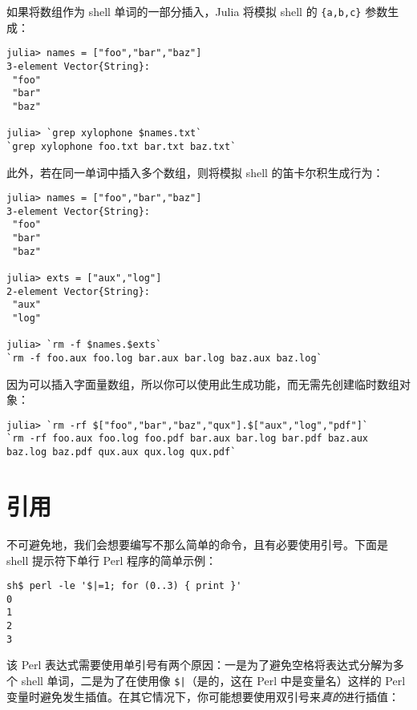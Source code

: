 如果将数组作为 shell 单词的一部分插入，Julia 将模拟 shell 的 \texttt{\{a,b,c\}} 参数生成：




\begin{verbatim}
julia> names = ["foo","bar","baz"]
3-element Vector{String}:
 "foo"
 "bar"
 "baz"

julia> `grep xylophone $names.txt`
`grep xylophone foo.txt bar.txt baz.txt`
\end{verbatim}



此外，若在同一单词中插入多个数组，则将模拟 shell 的笛卡尔积生成行为：




\begin{verbatim}
julia> names = ["foo","bar","baz"]
3-element Vector{String}:
 "foo"
 "bar"
 "baz"

julia> exts = ["aux","log"]
2-element Vector{String}:
 "aux"
 "log"

julia> `rm -f $names.$exts`
`rm -f foo.aux foo.log bar.aux bar.log baz.aux baz.log`
\end{verbatim}



因为可以插入字面量数组，所以你可以使用此生成功能，而无需先创建临时数组对象：




\begin{verbatim}
julia> `rm -rf $["foo","bar","baz","qux"].$["aux","log","pdf"]`
`rm -rf foo.aux foo.log foo.pdf bar.aux bar.log bar.pdf baz.aux baz.log baz.pdf qux.aux qux.log qux.pdf`
\end{verbatim}



\hypertarget{12430289445905702597}{}


\section{引用}



不可避免地，我们会想要编写不那么简单的命令，且有必要使用引号。下面是 shell 提示符下单行 Perl 程序的简单示例：




\begin{lstlisting}
sh$ perl -le '$|=1; for (0..3) { print }'
0
1
2
3
\end{lstlisting}



该 Perl 表达式需要使用单引号有两个原因：一是为了避免空格将表达式分解为多个 shell 单词，二是为了在使用像 \texttt{\$|}（是的，这在 Perl 中是变量名）这样的 Perl 变量时避免发生插值。在其它情况下，你可能想要使用双引号来\emph{真的}进行插值：




